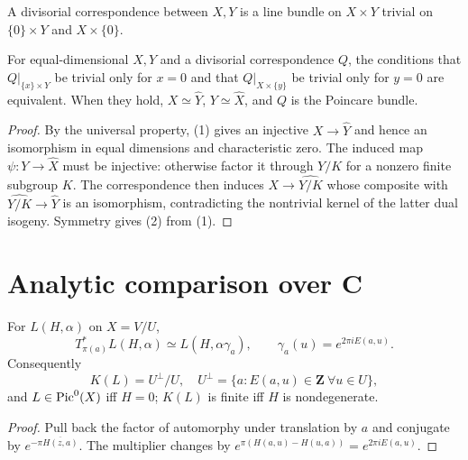 \begin{definition}
\label{mumford-source-divisorial-correspondence}
A divisorial correspondence between $X,Y$ is a line bundle on $X\times Y$
trivial on $\{0\}\times Y$ and $X\times\{0\}$.
\end{definition}

\begin{proposition}
\label{mumford-source-divisorial-biduality}
For equal-dimensional $X,Y$ and a divisorial correspondence $Q$, the
conditions that $Q|_{\{x\}\times Y}$ be trivial only for $x=0$ and that
$Q|_{X\times\{y\}}$ be trivial only for $y=0$ are equivalent. When they hold,
$X\simeq\widehat Y$, $Y\simeq\widehat X$, and $Q$ is the Poincare bundle.
\end{proposition}
\begin{proof}
By the universal property, (1) gives an injective $X\to\widehat Y$ and hence
an isomorphism in equal dimensions and characteristic zero. The induced map
$\psi:Y\to\widehat X$ must be injective: otherwise factor it through
$Y/K$ for a nonzero finite subgroup $K$. The correspondence then induces
$X\to\widehat{Y/K}$ whose composite with $\widehat{Y/K}\to\widehat Y$ is
an isomorphism, contradicting the nontrivial kernel of the latter dual
isogeny. Symmetry gives (2) from (1).
\end{proof}

\section{Analytic comparison over $\mathbf C$}
\label{mumford-source-II9}

\begin{theorem}
\label{mumford-thm-analytic-dual-comparison}
For $L(H,\alpha)$ on $X=V/U$,
\[
 T_{\pi(a)}^*L(H,\alpha)\simeq L(H,\alpha\gamma_a),
 \qquad \gamma_a(u)=e^{2\pi iE(a,u)}.
\]
Consequently
\[
 K(L)=U^\perp/U,
\quad U^\perp=\{a:E(a,u)\in\mathbf Z\ \forall u\in U\},
\]
and $L\in\operatorname{Pic}^0(X)$ iff $H=0$; $K(L)$ is finite iff $H$ is nondegenerate.
\end{theorem}
\begin{proof}
Pull back the factor of automorphy under translation by $a$ and conjugate by
$e^{-\pi\overline{H(z,a)}}$. The multiplier changes by
$e^{\pi(H(a,u)-H(u,a))}=e^{2\pi iE(a,u)}$.
\end{proof}

